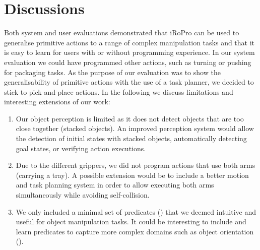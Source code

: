\section{Discussions}
\label{sec:discussion}
Both system and user evaluations demonstrated that iRoPro can be used to generalise primitive actions to a range of complex manipulation tasks and that it is easy to learn for users with or without programming experience.
In our system evaluation we could have programmed other actions, such as turning or pushing for packaging tasks.
As the purpose of our evaluation was to show the generalisability of primitive actions with the use of a task planner, we decided to stick to pick-and-place actions.
In the following we discuss limitations and interesting extensions of our work:
\begin{enumerate}
	\item Our object perception is limited as it does not detect objects that are too close together (\eg stacked objects).
	An improved perception system would allow the detection of initial states with stacked objects, automatically detecting goal states, or verifying action executions.
	\item Due to the different grippers, we did not program actions that use both arms (\eg carrying a tray). A possible extension would be to include a better motion and task planning system in order to allow executing both arms simultaneously while avoiding self-collision.
	\item We only included a minimal set of predicates () that we deemed intuitive and useful for object manipulation tasks.
	It could be interesting to include and learn predicates to capture more complex domains such as object orientation (\cite{li2016learning}).
\end{enumerate}

